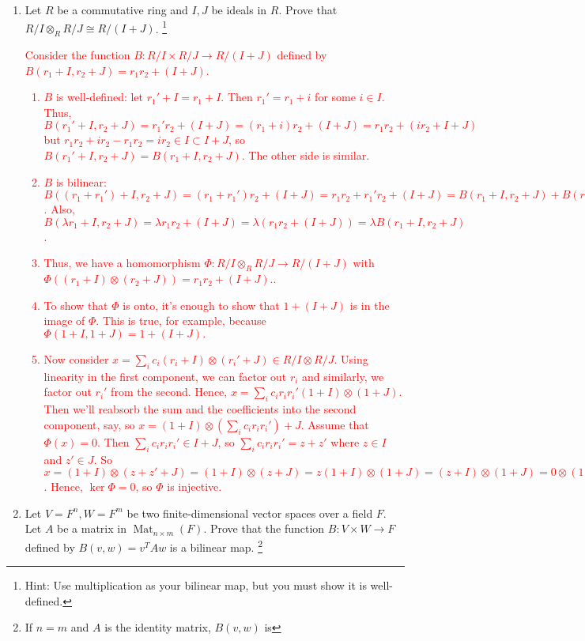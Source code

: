 \documentclass[12pt]{article}
\newcommand{\solution}[1]{\textcolor{red}{#1}}
\begin{document}
\begin{enumerate}
\item Let $R$ be a commutative ring and $I, J$ be ideals in $R$. Prove
  that $R/I\otimes_R R/J \cong R/(I+J)$. \footnote{Hint: Use
    multiplication as your bilinear map, but you must show it is
    well-defined.}
\solution{
Consider the function $B: R/I \times R/J \rightarrow R/(I+J)$ defined
by $B(r_1+I, r_2+J) = r_1r_2+(I+J)$.
\begin{enumerate}
\item $B$ is well-defined: let $r_1'+I=r_1+I$. Then $r_1'=r_1+i$ for
  some $i\in I$. Thus, $B(r_1'+I,r_2+J)=r_1'r_2+(I+J) =
  (r_1+i)r_2+(I+J) = r_1r_2+(i r_2+I+J)$ but
  $r_1r_2+ir_2-r_1r_2=ir_2\in I \subset I+J$, so $B(r_1'+I,r_2+J)
  =B(r_1+I,r_2+J)$. The other side is similar. 
\item $B$ is bilinear: $B((r_1+r_1')+I, r_2+J) = (r_1+r_1')r_2+(I+J) =
  r_1r_2+r_1'r_2+(I+J) = B(r_1+I, r_2+J)+B(r_1'+I,r_2+J)$. Also,
  $B(\lambda r_1+I, r_2+J)= \lambda r_1r_2 + (I+J) = \lambda
  (r_1r_2+(I+J)) =\lambda B(r_1+I, r_2+J)$. 
\item Thus, we have a homomorphism $\Phi: R/I \otimes_R R/J
  \rightarrow R/(I+J)$ with $\Phi( (r_1+I)\otimes (r_2+J)) = r_1r_2 +
  (I+J).$. 
\item To show that $\Phi$ is onto, it's enough to show that $1+(I+J)$
  is in the image of $\Phi$. This is true, for example, because
  $\Phi(1+I, 1+J) = 1+(I+J).$
\item Now consider $x=\sum\limits_i c_i (r_i +I)\otimes (r_i'+J)\in
  R/I\otimes R/J$. Using
  linearity in the first component, we can factor out $r_i$ and
  similarly, we factor out $r_i'$ from the second. Hence, $x=\sum_i
  c_ir_ir_i' (1+I)\otimes (1+J)$. Then we'll reabsorb the sum and the
  coefficients into the second component, say, so $x=(1+I)\otimes
  (\sum_i c_i r_ir_i')+J$. Assume that $\Phi(x)=0$. Then $\sum_i c_i
  r_i r_i' \in I+J$, so $\sum_i c_i r_i r_i'= z+z'$ where $z\in I$ and
  $z'\in J$. So $x=(1+I)\otimes (z+z'+J) = (1+I)\otimes (z+J)=
  z(1+I)\otimes (1+J) = (z+I) \otimes (1+J) = 0\otimes (1+J) =
  0$. Hence, $\ker \Phi=0$, so $\Phi$ is injective. 
\end{enumerate}
}
\item Let $V=F^n, W=F^m$ be two finite-dimensional vector spaces over
  a field $F$. Let $A$ be a matrix in $\operatorname{Mat}_{n\times
    m}(F)$. Prove that the function $B: V\times W \rightarrow F$
  defined by $B(v,w) = v^T A w$ is a bilinear map. \footnote{If $n=m$ and $A$ is the identity matrix, $B(v,w)$ is
}
\end{enumerate}
\end{document}
